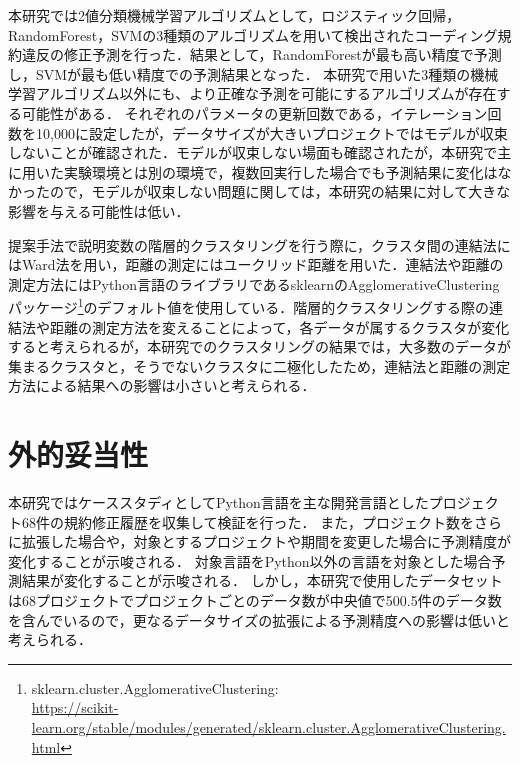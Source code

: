 \documentclass[11pt,dvipdfmx]{jreport}
\begin{document}
本研究では2値分類機械学習アルゴリズムとして，ロジスティック回帰，RandomForest，SVMの3種類のアルゴリズムを用いて検出されたコーディング規約違反の修正予測を行った．結果として，RandomForestが最も高い精度で予測し，SVMが最も低い精度での予測結果となった．
本研究で用いた3種類の機械学習アルゴリズム以外にも、より正確な予測を可能にするアルゴリズムが存在する可能性がある．
それぞれのパラメータの更新回数である，イテレーション回数を10,000に設定したが，データサイズが大きいプロジェクトではモデルが収束しないことが確認された．モデルが収束しない場面も確認されたが，本研究で主に用いた実験環境とは別の環境で，複数回実行した場合でも予測結果に変化はなかったので，モデルが収束しない問題に関しては，本研究の結果に対して大きな影響を与える可能性は低い．

提案手法で説明変数の階層的クラスタリングを行う際に，クラスタ間の連結法にはWard法を用い，距離の測定にはユークリッド距離を用いた．連結法や距離の測定方法にはPython言語のライブラリであるsklearnのAgglomerativeClusteringパッケージ\footnote{sklearn.cluster.AgglomerativeClustering: \\ \url{https://scikit-learn.org/stable/modules/generated/sklearn.cluster.AgglomerativeClustering.html}}のデフォルト値を使用している．階層的クラスタリングする際の連結法や距離の測定方法を変えることによって，各データが属するクラスタが変化すると考えられるが，本研究でのクラスタリングの結果では，大多数のデータが集まるクラスタと，そうでないクラスタに二極化したため，連結法と距離の測定方法による結果への影響は小さいと考えられる．

\section{外的妥当性}

本研究ではケーススタディとしてPython言語を主な開発言語としたプロジェクト68件の規約修正履歴を収集して検証を行った．
また，プロジェクト数をさらに拡張した場合や，対象とするプロジェクトや期間を変更した場合に予測精度が変化することが示唆される．
対象言語をPython以外の言語を対象とした場合予測結果が変化することが示唆される．
しかし，本研究で使用したデータセットは68プロジェクトでプロジェクトごとのデータ数が中央値で500.5件のデータ数を含んでいるので，更なるデータサイズの拡張による予測精度への影響は低いと考えられる．

\end{document}
